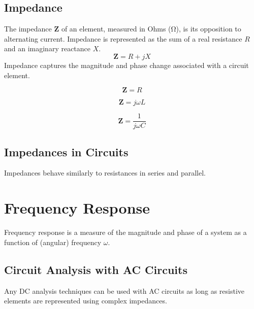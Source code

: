 \documentclass{article}
\begin{document}
\subsection{Impedance}
\begin{definition}
    The impedance \(\symbf{Z}\) of an element, measured in Ohms (\unit{\ohm}), is its opposition to alternating current.
    Impedance is represented as the sum of a real resistance \(R\) and an imaginary reactance \(X\).
    \begin{equation*}
        \symbf{Z} = R + jX
    \end{equation*}
    Impedance captures the magnitude and phase change associated with a circuit element.
\end{definition}
\begin{theorem}
    \begin{equation*}
        \symbf{Z} = R
    \end{equation*}
\end{theorem}
\begin{theorem}
    \begin{equation*}
        \symbf{Z} = j\omega L
    \end{equation*}
\end{theorem}
\begin{theorem}
    \begin{equation*}
        \symbf{Z} = \frac{1}{j\omega C}
    \end{equation*}
\end{theorem}
\subsection{Impedances in Circuits}
\begin{theorem}
    Impedances behave similarly to resistances in series and parallel.
\end{theorem}
\newpage
\section{Frequency Response}
Frequency response is a measure of the magnitude and phase of a system
as a function of (angular) frequency \(\omega\).
\subsection{Circuit Analysis with AC Circuits}
\begin{theorem}
    Any DC analysis techniques can be used with AC circuits as long as
    resistive elements are represented using complex impedances.
\end{theorem}
\end{document}
